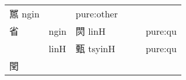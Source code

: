 \documentclass[14pt,a4paper]{scrartcl}
\begin{document}
\begin{longtable}[c]{@{}llllll@{}}
\begin{minipage}[t]{0.14\columnwidth}
嚚 ngin
\strut\end{minipage} &
\begin{minipage}[t]{0.14\columnwidth}\raggedright\strut
\strut\end{minipage} &
\begin{minipage}[t]{0.14\columnwidth}\raggedright\strut
pure:other
\strut\end{minipage}\tabularnewline
\begin{minipage}[t]{0.14\columnwidth}\raggedright\strut
省
\strut\end{minipage} &
\begin{minipage}[t]{0.14\columnwidth}\raggedright\strut
ngin
\strut\end{minipage} &
\begin{minipage}[t]{0.14\columnwidth}\raggedright\strut
焛 linH
\strut\end{minipage} &
\begin{minipage}[t]{0.14\columnwidth}\raggedright\strut
\strut\end{minipage} &
\begin{minipage}[t]{0.14\columnwidth}\raggedright\strut
\strut\end{minipage} &
\begin{minipage}[t]{0.14\columnwidth}\raggedright\strut
pure:qu
\strut\end{minipage}\tabularnewline
\begin{minipage}[t]{0.14\columnwidth}\raggedright\strut
𡍯
\strut\end{minipage} &
\begin{minipage}[t]{0.14\columnwidth}\raggedright\strut
linH
\strut\end{minipage} &
\begin{minipage}[t]{0.14\columnwidth}\raggedright\strut
甄 tsyinH
\strut\end{minipage} &
\begin{minipage}[t]{0.14\columnwidth}\raggedright\strut
\strut\end{minipage} &
\begin{minipage}[t]{0.14\columnwidth}\raggedright\strut
\strut\end{minipage} &
\begin{minipage}[t]{0.14\columnwidth}\raggedright\strut
pure:qu
\strut\end{minipage}\tabularnewline
\begin{minipage}[t]{0.14\columnwidth}\raggedright\strut
閏
\strut\end{minipage} &
\begin{minipage}[t]{0.14\columnwidth}\raggedright\strut

\end{minipage}
\end{longtable}
\end{document}
